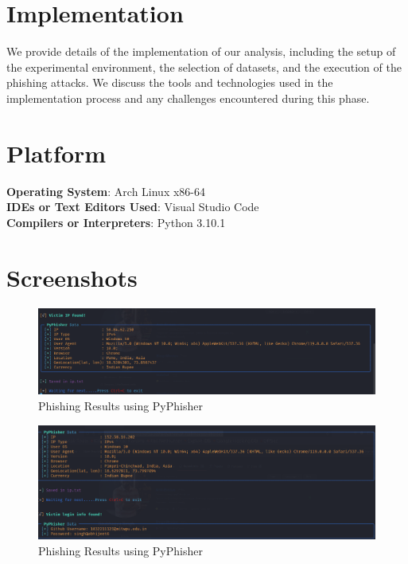 \documentclass[openany]{report}
\begin{document}
\section{Implementation}

We provide details of the implementation of our analysis, including the setup of the experimental environment, the selection of datasets, and the execution of the phishing attacks. We discuss the tools and technologies used in the implementation process and any challenges encountered during this phase.

\section{Platform}
\textbf{Operating System}: Arch Linux x86-64 \\
\textbf{IDEs or Text Editors Used}: Visual Studio Code\\
\textbf{Compilers or Interpreters}: Python 3.10.1\\

\section{Screenshots}

\begin{figure}[H]
    \centering
    \includegraphics[width=.95\textwidth]{phishing images/aaron.png}
    \caption{Phishing Results using PyPhisher}
    \label{fig:implementation_1}
\end{figure}

\begin{figure}[H]
    \centering
    \includegraphics[width=.95\textwidth]{phishing images/abhijeet.png}
    \caption{Phishing Results using PyPhisher}
    \label{fig:implementation_1}
\end{figure}
\end{document}
